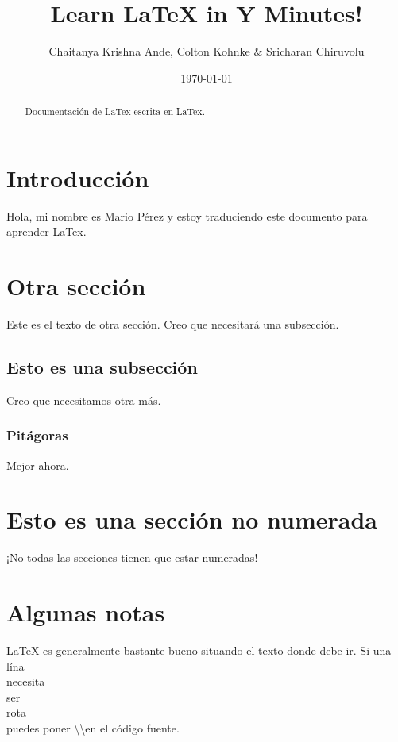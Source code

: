 \documentclass[12pt]{article}
\author{Chaitanya Krishna Ande, Colton Kohnke \& Sricharan Chiruvolu}
\date{\today}
\title{Learn LaTeX in Y Minutes!}
\begin{document}
\maketitle

\begin{abstract}
 Documentación de LaTex escrita en LaTex.
\end{abstract}

\section{Introducción}
Hola, mi nombre es Mario Pérez y estoy traduciendo este documento para aprender LaTex.

\section{Otra sección}
Este es el texto de otra sección. Creo que necesitará una subsección.

\subsection{Esto es una subsección} %
Creo que necesitamos otra más.

\subsubsection{Pitágoras}
Mejor ahora.
\label{subsec:pitagoras}

\section*{Esto es una sección no numerada}
¡No todas las secciones tienen que estar numeradas!

\section{Algunas notas}
LaTeX es generalmente bastante bueno situando el texto donde debe ir. Si una lína \\ necesita \\ ser \\ rota \\ puedes poner \textbackslash\textbackslash en el código fuente. \\
\end{document}
